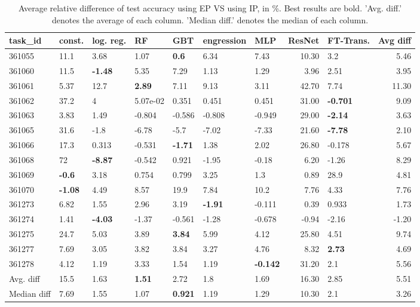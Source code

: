 \begin{table}[ht!]
\centering
\begingroup\footnotesize
\begin{tabular}{lllllllrlr}
  \hline
\hline
task\_id & const. & log. reg. & RF & GBT & engression & MLP & ResNet & FT-Trans. & Avg diff \\ 
  \hline
361055 & 11.1 & 3.68 & 1.07 & \textbf{0.6} & 6.34 & 7.43 & 10.30 & 3.2 & 5.46 \\ 
  361060 & 11.5 & \textbf{-1.48} & 5.35 & 7.29 & 1.13 & 1.29 & 3.96 & 2.51 & 3.95 \\ 
  361061 & 5.37 & 12.7 & \textbf{2.89} & 7.11 & 9.13 & 3.11 & 42.70 & 7.74 & 11.30 \\ 
  361062 & 37.2 & 4 & 5.07e-02 & 0.351 & 0.451 & 0.451 & 31.00 & \textbf{-0.701} & 9.09 \\ 
  361063 & 3.83 & 1.49 & -0.804 & -0.586 & -0.808 & -0.949 & 29.00 & \textbf{-2.14} & 3.63 \\ 
  361065 & 31.6 & -1.8 & -6.78 & -5.7 & -7.02 & -7.33 & 21.60 & \textbf{-7.78} & 2.10 \\ 
  361066 & 17.3 & 0.313 & -0.531 & \textbf{-1.71} & 1.38 & 2.02 & 26.80 & -0.178 & 5.67 \\ 
  361068 & 72 & \textbf{-8.87} & -0.542 & 0.921 & -1.95 & -0.18 & 6.20 & -1.26 & 8.29 \\ 
  361069 & \textbf{-0.6} & 3.18 & 0.754 & 0.799 & 3.25 & 1.3 & 0.89 & 28.9 & 4.81 \\ 
  361070 & \textbf{-1.08} & 4.49 & 8.57 & 19.9 & 7.84 & 10.2 & 7.76 & 4.33 & 7.76 \\ 
  361273 & 6.82 & 1.55 & 2.96 & 3.19 & \textbf{-1.91} & -0.111 & 0.39 & 0.933 & 1.73 \\ 
  361274 & 1.41 & \textbf{-4.03} & -1.37 & -0.561 & -1.28 & -0.678 & -0.94 & -2.16 & -1.20 \\ 
  361275 & 24.7 & 5.03 & 3.89 & \textbf{3.84} & 5.99 & 4.12 & 25.80 & 4.51 & 9.74 \\ 
  361277 & 7.69 & 3.05 & 3.82 & 3.84 & 3.27 & 4.76 & 8.32 & \textbf{2.73} & 4.69 \\ 
  361278 & 4.12 & 1.19 & 3.33 & 1.54 & 1.19 & \textbf{-0.142} & 31.20 & 2.1 & 5.56 \\ 
   \hline
Avg. diff & 15.5 & 1.63 & \textbf{1.51} & 2.72 & 1.8 & 1.69 & 16.30 & 2.85 & 5.51 \\ 
  Median diff & 7.69 & 1.55 & 1.07 & \textbf{0.921} & 1.19 & 1.29 & 10.30 & 2.1 & 3.26 \\ 
   \hline
\hline
\end{tabular}
\endgroup
\caption{Average relative difference of test accuracy using EP VS using IP, in \%. 
                  Best results are bold. 
                  'Avg. diff.' denotes the average of each column.
                  'Median diff.' denotes the median of each column.} 
\label{TABLES/table_results_accuracy_umap_only_num_features_EP_VS_IP}
\end{table}

